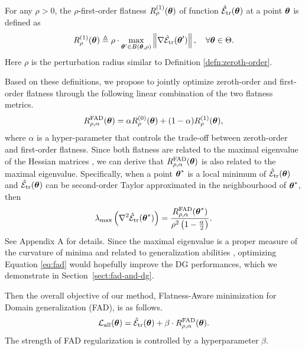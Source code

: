\begin{definition} \label{defn:first-order}
    For any $\rho > 0$, the $\rho$-first-order flatness $R^{(1)}_{\rho}(\boldsymbol{\theta})$ of function $\hat{\mathcal{E}}_{{\text{tr}}}(\boldsymbol{\theta})$ at a point $\boldsymbol{\theta}$ is defined as
    \begin{equation} \label{eq:GAM}
        R^{(1)}_{\rho}(\boldsymbol{\theta}) \triangleq \rho \cdot \max_{\boldsymbol{\theta}' \in B(\boldsymbol{\theta}, \rho)} \left\|\nabla \hat{\mathcal{E}}_{{\text{tr}}}(\boldsymbol{\theta}')\right\|, \quad \forall \boldsymbol{\theta} \in \Theta.
    \end{equation}
    Here $\rho$ is the perturbation radius similar to Definition \ref{defn:zeroth-order}.
\end{definition}

Based on these definitions, we propose to jointly optimize zeroth-order and first-order flatness through the following linear combination of the two flatness metrics.
\begin{equation} \label{eq:fad}
    R^{\text{FAD}}_{\rho, \alpha}(\boldsymbol{\theta}) = \alpha R^{(0)}_{\rho}(\boldsymbol{\theta}) + (1 - \alpha) R^{(1)}_{\rho}(\boldsymbol{\theta}),
\end{equation}
where $\alpha$ is a hyper-parameter that controls the trade-off between zeroth-order and first-order flatness. Since both flatness are related to the maximal eigenvalue of the Hessian matrices \cite{zhuang2022surrogate,Zhang2023GradientNA}, we can derive that $R^{\text{FAD}}_{\rho, \alpha}(\boldsymbol{\theta})$ is also related to the maximal eigenvalue. Specifically, when a point $\boldsymbol{\theta}^*$ is a local minimum of $\hat{\mathcal{E}}_{{\text{tr}}}(\boldsymbol{\theta})$ and $\hat{\mathcal{E}}_{{\text{tr}}}(\boldsymbol{\theta})$ can be second-order Taylor approximated in the neighbourhood of $\boldsymbol{\theta}^*$, then
\begin{equation} \label{eq:fad-eigen}
  \lambda_{\max}\left(\nabla^2 \hat{\mathcal{E}}_{{\text{tr}}}(\boldsymbol{\theta}^*)\right) = \frac{R^{\text{FAD}}_{\rho, \alpha}(\boldsymbol{\theta}^*)}{\rho^2\left(1 - \frac{\alpha}{2}\right)}.
\end{equation}
See Appendix A for details. Since the maximal eigenvalue is a proper measure of the curvature of minima \cite{kaur2022maximum,keskar2016large} and related to generalization abilities \cite{Zhang2023GradientNA,chen2021vision,jastrzkebski2017three}, optimizing Equation \eqref{eq:fad} would hopefully improve the DG performances, which we demonstrate in Section~\ref{sect:fad-and-dg}.

Then the overall objective of our method, Flatness-Aware minimization for Domain generalization (FAD), is as follows.
\begin{equation} \label{eq:all-loss}
    \mathcal{L}_{\text{all}}(\boldsymbol{\theta}) = \hat{\mathcal{E}}_{{\text{tr}}}(\boldsymbol{\theta}) + \beta \cdot R^{\text{FAD}}_{\rho, \alpha}(\boldsymbol{\theta}).
\end{equation}
The strength of FAD regularization is controlled by a hyperparameter $\beta$.

